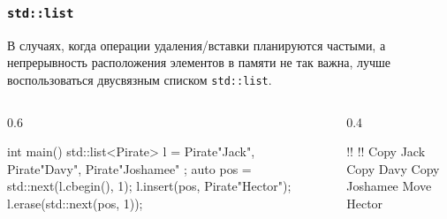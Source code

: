 \documentclass[compress, 8pt, aspectratio=169]{beamer}
\begin{document}
  \begin{frame}[fragile]

    \frametitle{\texttt{std::list}}

    В случаях, когда операции удаления/вставки планируются частыми,
    а непрерывность расположения элементов в памяти не так важна,
    лучше воспользоваться двусвязным списком \texttt{std::list}\footnotemark{}.


    \begin{columns}[T]

      \begin{column}{0.6\textwidth}

        \begin{mycppinplacelisting}
int main() {
    std::list<Pirate> l = {
        Pirate{"Jack"},
        Pirate{"Davy"},
        Pirate{"Joshamee"}
    };
    auto pos =
      std::next(l.cbegin(), 1);
    l.insert(pos, Pirate{"Hector"});
    l.erase(std::next(pos, 1));
}
        \end{mycppinplacelisting}

      \end{column}

      \begin{column}{0.4\textwidth}

        \begin{terminalwindow}
!!
!!
Copy Jack
Copy Davy
Copy Joshamee
Move Hector
        \end{terminalwindow}

      \end{column}

    \end{columns}

  \end{frame}
\end{document}
